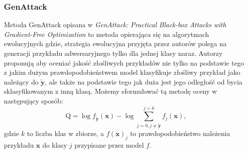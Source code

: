 \documentclass[
    left=2.5cm,         %
    right=2.5cm,        %
    top=2.5cm,          %
    bottom=3cm,         %
    bindingoffset=6mm,  %
    nohyphenation=false %
]{eiti/eiti-thesis}
\renewcommand{\vec}[1]{\mathbf{#1}}
\begin{document}
\subsubsection{GenAttack}
Metoda GenAttack opisana w \textit{GenAttack: Practical Black-box Attacks with Gradient-Free Optimization}\cite{DBLP:journals/corr/abs-1805-11090}
to metoda opierająca się na algorytmach ewolucyjnych gdzie, strategia ewolucyjna przyjęta przez autorów polega na generacji przykładu adwersaryjnego tylko dla jednej klasy naraz.
Autorzy proponują aby oceniać jakość złośliwych przykładów nie tylko na podstawie tego z jakim dużym prawdopodobieństwem
model klasyfikuje złośliwy przykład jako należący do \(\vec{\widetilde{y}}\), ale także na podstawie tego jak duża jest jego
odległość od bycia sklasyfikowanym z inną klasą.
Możemy sformułować tą metodę oceny w następujący sposób:
\begin{equation}
    \text{Q} = \log{f_{\vec{\widetilde{y}}}(\vec{x})} - \log\sum^{j=k}_{j=0,j\neq \vec{\widetilde{y}}} f_j(\vec{x}),
\end{equation}
gdzie \(k\) to liczba klas w zbiorze, a \(f(\vec{x})_j\) to prawdopodobieństwo należenia przykładu \(\vec{x}\) do klasy \(j\) przypisane przez model \(f\).
\end{document}
